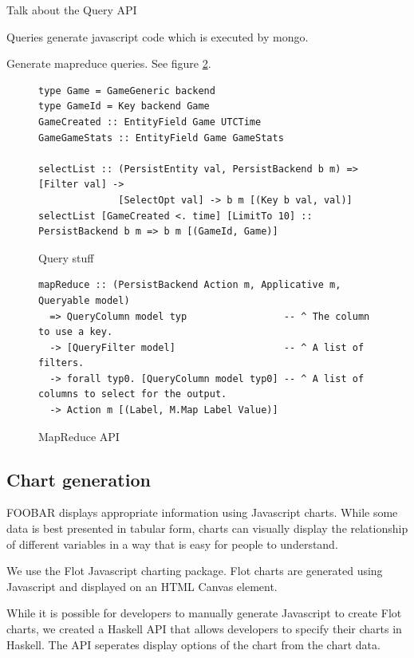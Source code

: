 \documentclass{chi2009}
\begin{document}
Talk about the Query API

Queries generate javascript code which is executed by mongo.

Generate mapreduce queries. See figure \ref{mrapi}.

\begin{figure}[t]
\begin{verbatim}
type Game = GameGeneric backend
type GameId = Key backend Game
GameCreated :: EntityField Game UTCTime
GameGameStats :: EntityField Game GameStats

selectList :: (PersistEntity val, PersistBackend b m) => [Filter val] ->
              [SelectOpt val] -> b m [(Key b val, val)]
selectList [GameCreated <. time] [LimitTo 10] :: PersistBackend b m => b m [(GameId, Game)]
\end{verbatim}
    \caption{Query stuff}
    \label{querycode}
\end{figure}

\begin{figure}[t]
\begin{verbatim}
mapReduce :: (PersistBackend Action m, Applicative m, Queryable model)
  => QueryColumn model typ                 -- ^ The column to use a key.
  -> [QueryFilter model]                   -- ^ A list of filters.
  -> forall typ0. [QueryColumn model typ0] -- ^ A list of columns to select for the output.
  -> Action m [(Label, M.Map Label Value)]
\end{verbatim}
    \caption{MapReduce API}
    \label{mrapi}
\end{figure}

\subsection{Chart generation}

FOOBAR displays appropriate information using Javascript charts. While some data is best presented in tabular form, charts can visually display the relationship of different variables in a way that is easy for people to understand.

We use the Flot Javascript charting package. Flot charts are generated using Javascript and displayed on an HTML Canvas element. 

While it is possible for developers to manually generate Javascript to create Flot charts, we created a Haskell API that allows developers to specify their charts in Haskell. The API seperates display options of the chart from the chart data.
\end{document}
